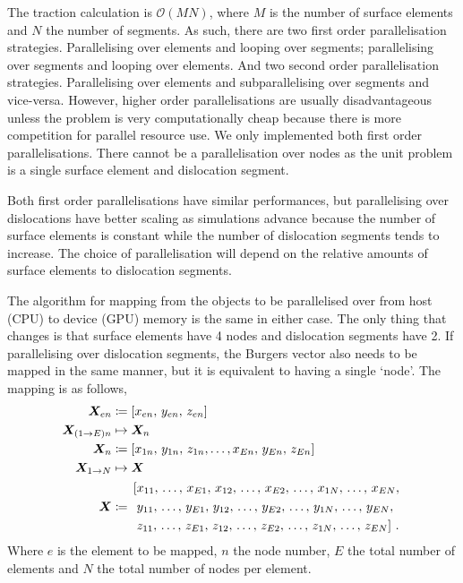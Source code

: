 The traction calculation is $\mathcal{O}(MN)$, where $M$ is the number of surface elements and $N$
the number of segments. As such, there are two first order parallelisation strategies. Parallelising over elements and looping over segments; parallelising over segments and looping over elements. And two second order parallelisation strategies. Parallelising over elements and subparallelising over segments and vice-versa. However, higher order parallelisations are usually disadvantageous unless the problem is very computationally cheap because there is more competition for parallel resource use. We only implemented both first order parallelisations. There cannot be a parallelisation over nodes as the unit problem is a single surface element and dislocation segment.

Both first order parallelisations have similar performances, but parallelising over dislocations have better scaling as simulations advance because the number of surface elements is constant while the number of dislocation segments tends to increase. The choice of parallelisation will depend on the relative amounts of surface elements to dislocation segments.

The algorithm for mapping from the objects to be parallelised over from host (CPU) to device (GPU) memory is the same in either case. The only thing that changes is that surface elements have 4 nodes and dislocation segments have 2. If parallelising over dislocation segments, the Burgers vector also needs to be mapped in the same manner, but it is equivalent to having a single `node'. The mapping is as follows,
\begin{subequations}\label{eq:hostDeviceElementMap}
    \begin{align}
        \vec{X}_{en}        & \coloneqq	\left[x_{en},\, y_{en},\, z_{en}\right]                                                     \\
        \vec{X}_{(1\to E)n} & \mapsto 	\vec{X}_{n} \nn
        \vec{X}_{n}         & \coloneqq	\left[x_{1n},\, y_{1n},\, z_{1n},\ldots,x_{En},\, y_{En},\, z_{En}\right]\label{seq:xn_arr} \\
        \vec{X}_{1\to N}    & \mapsto	\vec{X}\nn
        \vec{X}             & \coloneqq
        \begin{aligned}
             & \left[x_{11},\, \ldots,\, x_{E1},\, x_{12},\, \ldots,\, x_{E2},\, \ldots,\, x_{1N},\, \ldots,\, x_{EN}, \right.      \\
             & \left.\,y_{11},\, \ldots,\, y_{E1},\, y_{12},\, \ldots,\, y_{E2},\, \ldots,\, y_{1N},\, \ldots,\, y_{EN}, \right.    \\
             & \left.\,z_{11},\, \ldots,\, z_{E1},\, z_{12},\, \ldots,\, z_{E2},\, \ldots,\, z_{1N},\, \ldots,\, z_{EN}  \right]\,.
        \end{aligned}
    \end{align}
\end{subequations}
Where $ e $ is the element to be mapped, $ n $ the node number, $ E $ the total number of elements and $N$ the total number of nodes per element.

